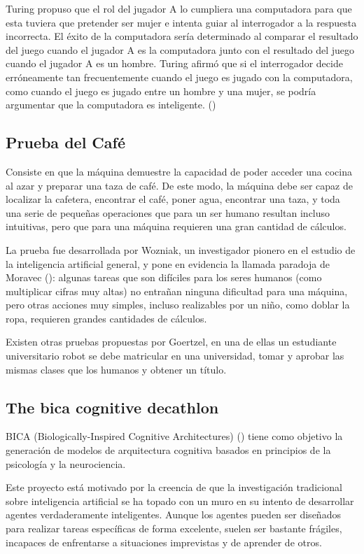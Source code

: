 Turing propuso que el rol del jugador A lo cumpliera una computadora para que esta tuviera que pretender ser mujer e intenta guiar al interrogador a la respuesta incorrecta. El éxito de la computadora sería determinado al comparar el resultado del juego cuando el jugador A es la computadora junto con el resultado del juego cuando el jugador A es un hombre. Turing afirmó que si el interrogador decide erróneamente tan frecuentemente cuando el juego es jugado con la computadora, como cuando el juego es jugado entre un hombre y una mujer, se podría argumentar que la computadora es inteligente. (\cite{pinar2000turing})

\subsection{Prueba del Café}

Consiste en que la máquina demuestre la capacidad de poder acceder una cocina al azar y preparar una taza de café. De este modo, la máquina debe ser capaz de localizar la cafetera, encontrar el café, poner agua, encontrar una taza, y toda una serie de pequeñas operaciones que para un ser humano resultan incluso intuitivas, pero que para una máquina requieren una gran cantidad de cálculos.

La prueba fue desarrollada por Wozniak, un investigador pionero en el estudio de la inteligencia artificial general, y pone en evidencia la llamada paradoja de Moravec (\cite{rotenberg2013moravec}): algunas tareas que son difíciles para los seres humanos (como multiplicar cifras muy altas) no entrañan ninguna dificultad para una máquina, pero otras acciones muy simples, incluso realizables por un niño, como doblar la ropa, requieren grandes cantidades de cálculos.

Existen otras pruebas propuestas por Goertzel, en una de ellas un estudiante universitario robot se debe matricular en una universidad, tomar y aprobar las mismas clases que los humanos y obtener un título.

\subsection{The bica cognitive decathlon}

BICA (Biologically-Inspired Cognitive Architectures) (\cite{mueller2007bica}) tiene como objetivo la generación de modelos de arquitectura cognitiva basados en principios de la psicología y la neurociencia. 

Este proyecto está motivado por la creencia de que la investigación tradicional sobre inteligencia artificial se ha topado con un muro en su intento de desarrollar agentes verdaderamente inteligentes. Aunque los agentes pueden ser diseñados para realizar tareas específicas de forma excelente, suelen ser bastante frágiles, incapaces de enfrentarse a situaciones imprevistas y de aprender de otros. 

